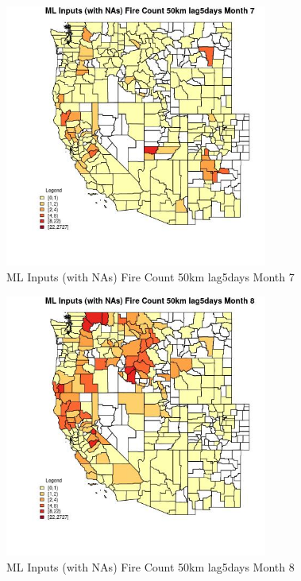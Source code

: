 \begin{figure} 
\centering  
\includegraphics[width=0.77\textwidth]{Code_Outputs/Report_ML_input_PM25_Step4_part_f_de_duplicated_aveswNAs_CountyFire_Count_50km_lag5daysmedianMonth7.jpg} 
\caption{\label{fig:Report_ML_input_PM25_Step4_part_f_de_duplicated_aveswNAsCountyFire_Count_50km_lag5daysmedianMonth7}ML Inputs (with NAs) Fire Count 50km lag5days Month 7} 
\end{figure} 
 

\begin{figure} 
\centering  
\includegraphics[width=0.77\textwidth]{Code_Outputs/Report_ML_input_PM25_Step4_part_f_de_duplicated_aveswNAs_CountyFire_Count_50km_lag5daysmedianMonth8.jpg} 
\caption{\label{fig:Report_ML_input_PM25_Step4_part_f_de_duplicated_aveswNAsCountyFire_Count_50km_lag5daysmedianMonth8}ML Inputs (with NAs) Fire Count 50km lag5days Month 8} 
\end{figure} 
 

